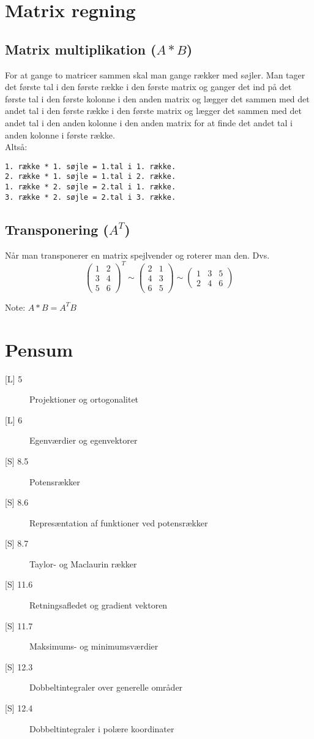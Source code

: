 \documentclass{article}
\begin{document}
\newpage

\section{Matrix regning}
\subsection{Matrix multiplikation ($A*B$)}
For at gange to matricer sammen skal man gange rækker med søjler.
Man tager det første tal i den første række i den første matrix og ganger det 
ind på det første tal i den første kolonne i den anden matrix og lægger det 
sammen med det andet tal i den første række i den første matrix og lægger det 
sammen med det andet tal i den anden kolonne i den anden matrix for at finde 
det andet tal i anden kolonne i første række.\\
Altså:
\begin{verbatim}
1. række * 1. søjle = 1.tal i 1. række.
2. række * 1. søjle = 1.tal i 2. række.
1. række * 2. søjle = 2.tal i 1. række.
3. række * 2. søjle = 2.tal i 3. række.
\end{verbatim}
\subsection{Transponering ($A^T$)}
Når man transponerer en matrix spejlvender og roterer man den. Dvs.
$$\begin{pmatrix}
1 & 2\\
3 & 4\\
5 & 6
\end{pmatrix}^T
\sim
\begin{pmatrix}
2 & 1\\
4 & 3\\
6 & 5
\end{pmatrix}
\sim
\begin{pmatrix}
1&3&5\\
2&4&6
\end{pmatrix}
$$


Note: $A*B=A^TB$
\newpage
\section{Pensum}
\begin{description}
\item [{[L]} 5] Projektioner og ortogonalitet
\item [{[L]} 6] Egenværdier og egenvektorer
\item [{[S]} 8.5] Potensrækker
\item [{[S]} 8.6] Represæntation af funktioner ved potensrækker
\item [{[S]} 8.7] Taylor- og Maclaurin rækker
\item [{[S]} 11.6] Retningsafledet og gradient vektoren
\item [{[S]} 11.7] Maksimums- og minimumsværdier
\item [{[S]} 12.3] Dobbeltintegraler over generelle områder
\item [{[S]} 12.4] Dobbeltintegraler i polære koordinater
\end{description}
\end{document}
